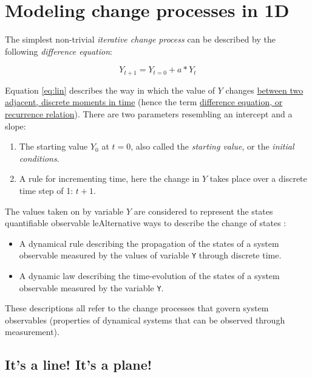 \documentclass[]{book}
\providecommand{\tightlist}{%
  \setlength{\itemsep}{0pt}\setlength{\parskip}{0pt}}
\let\stdsection\section
\renewcommand\section{\newpage\stdsection}
\begin{document}
\section*{Modeling change processes in
1D}\label{modeling-change-processes-in-1d}

The simplest non-trivial \emph{iterative change process} can be
described by the following \emph{difference equation}:

\begin{equation}
Y_{t+1} = Y_{t=0} + a*Y_t
\label{eq:lin}
\end{equation}

Equation \eqref{eq:lin} describes the way in which the value of \(Y\)
changes
\href{https://en.wikipedia.org/wiki/Discrete_time_and_continuous_time}{between
two adjacent, discrete moments in time} (hence the term
\href{https://en.wikipedia.org/wiki/Recurrence_relation}{difference
equation, or recurrence relation}). There are two parameters resembling
an intercept and a slope:

\begin{enumerate}
\def\labelenumi{\arabic{enumi}.}
\tightlist
\item
  The starting value \(Y_0\) at \(t=0\), also called the \emph{starting
  value}, or the \emph{initial conditions}.
\item
  A rule for incrementing time, here the change in \(Y\) takes place
  over a discrete time step of 1: \(t+1\).
\end{enumerate}

The values taken on by variable \(Y\) are considered to represent the
states quantifiable observable leAlternative ways to describe the change
of states :

\begin{itemize}
\tightlist
\item
  A dynamical rule describing the propagation of the states of a system
  observable measured by the values of variable \texttt{Y} through
  discrete time.
\item
  A dynamic law describing the time-evolution of the states of a system
  observable measured by the variable \texttt{Y}.
\end{itemize}

These descriptions all refer to the change processes that govern system
observables (properties of dynamical systems that can be observed
through measurement).

\subsection*{\texorpdfstring{\textbf{It's a line! It's a
plane!}}{It's a line! It's a plane!}}\label{its-a-line-its-a-plane}
\end{document}
